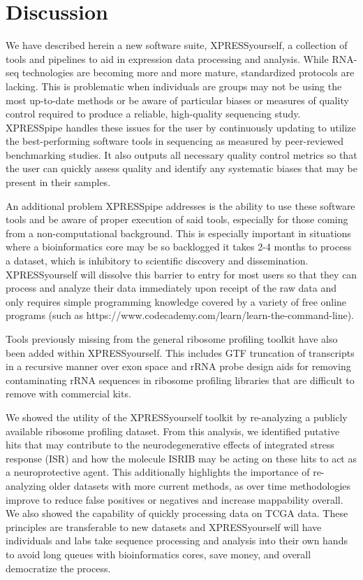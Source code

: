 \documentclass[11pt, a4paper, oneside]{article}
\begin{document}
\section{Discussion}
We have described herein a new software suite, XPRESSyourself, a collection of tools and pipelines to aid in expression data processing and analysis. While RNA-seq technologies are becoming more and more mature, standardized protocols are lacking. This is problematic when individuals are groups may not be using the most up-to-date methods or be aware of particular biases or measures of quality control required to produce a reliable, high-quality sequencing study. XPRESSpipe handles these issues for the user by continuously updating to utilize the best-performing software tools in sequencing as measured by peer-reviewed benchmarking studies. It also outputs all necessary quality control metrics so that the user can quickly assess quality and identify any systematic biases that may be present in their samples.

An additional problem XPRESSpipe addresses is the ability to use these software tools and be aware of proper execution of said tools, especially for those coming from a non-computational background. This is especially important in situations where a bioinformatics core may be so backlogged it takes 2-4 months to process a dataset, which is inhibitory to scientific discovery and dissemination. XPRESSyourself will dissolve this barrier to entry for most users so that they can process and analyze their data immediately upon receipt of the raw data and only requires simple programming knowledge covered by a variety of free online programs (such as https://www.codecademy.com/learn/learn-the-command-line).

Tools previously missing from the general ribosome profiling toolkit have also been added within XPRESSyourself. This includes GTF truncation of transcripts in a recursive manner over exon space and rRNA probe design aids for removing contaminating rRNA sequences in ribosome profiling libraries that are difficult to remove with commercial kits.

We showed the utility of the XPRESSyourself toolkit by re-analyzing a publicly available ribosome profiling dataset. From this analysis, we identified putative hits that may contribute to the neurodegenerative effects of integrated stress response (ISR) and how the molecule ISRIB may be acting on these hits to act as a neuroprotective agent. This additionally highlights the importance of re-analyzing older datasets with more current methods, as over time methodologies improve to reduce false positives or negatives and increase mappability overall. We also showed the capability of quickly processing data on TCGA data. These principles are transferable to new datasets and XPRESSyourself will have individuals and labs take sequence processing and analysis into their own hands to avoid long queues with bioinformatics cores, save money, and overall democratize the process.
\end{document}
